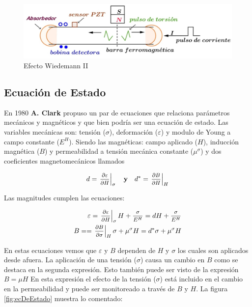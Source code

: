 \begin{figure}[H]
    \centering
    \includegraphics[width=01.0\textwidth]{./Figures/efectoWiedemann2}
	\caption{Efecto Wiedemann II}
	\label{fig:efectoWiedemann2}
\end{figure}

\subsection{Ecuación de Estado}

En 1980 \textbf{A. Clark} propuso un par de ecuaciones que relaciona parámetros mecánicos y magnéticos y que bien podría ser una ecuación de estado. Las variables mecánicas son: tensión ($\sigma$), deformación ($\varepsilon$) y modulo de Young a campo constante ($E^{H}$). Siendo las magnéticas: campo aplicado ($H$), inducción magnética ($B$) y permeabilidad a tensión mecánica constante ($\mu^{\sigma}$) y dos coeficientes magnetomecánicos llamados

\begin{equation}
d    =\left. \mfrac{\partial \varepsilon}{\partial H}\right|_{\sigma} \quad \textbf{y} \quad 
d^{*}=\left. \mfrac{\partial B          }{\partial H}\right|_{H}
\end{equation}

Las magnitudes cumplen las ecuaciones:

 
\begin{equation}
\begin{aligned}
\varepsilon =\left. \mfrac{\partial \varepsilon}{\partial H}\right|_{\sigma} H + \mfrac{\sigma}{E^{H}} = d H +  \mfrac{\sigma}{E^{H}} \\
B= =\left. \mfrac{\partial B }{\partial \sigma}\right|_{H} \sigma + \mu^{\sigma} H = d^{*}\sigma + \mu^{\sigma} H
\end{aligned}
\end{equation}

En estas ecuaciones vemos que $\varepsilon$ y $B$ dependen de $H$ y $\sigma$ los cuales son aplicados desde afuera. La aplicación de una tensión ($\sigma$) causa un cambio en $B$ como se destaca en la segunda expresión. Esto también puede ser visto de la expresión $B=\mu H$ En esta expresión el efecto de la tensión ($\sigma$) está incluido en el cambio en la permeabilidad y puede ser monitoreado a través de $B$ y $H$. La figura \ref{fig:ecDeEstado} muestra lo comentado:

